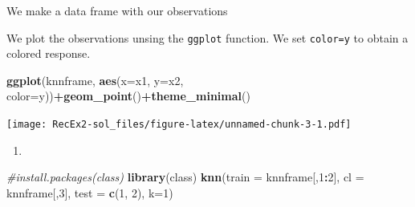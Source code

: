 \documentclass[]{article}
\newenvironment{Shaded}{\begin{snugshade}}{\end{snugshade}}
\newcommand{\KeywordTok}[1]{\textcolor[rgb]{0.13,0.29,0.53}{\textbf{#1}}}
\newcommand{\DataTypeTok}[1]{\textcolor[rgb]{0.13,0.29,0.53}{#1}}
\newcommand{\DecValTok}[1]{\textcolor[rgb]{0.00,0.00,0.81}{#1}}
\newcommand{\StringTok}[1]{\textcolor[rgb]{0.31,0.60,0.02}{#1}}
\newcommand{\CommentTok}[1]{\textcolor[rgb]{0.56,0.35,0.01}{\textit{#1}}}
\newcommand{\OperatorTok}[1]{\textcolor[rgb]{0.81,0.36,0.00}{\textbf{#1}}}
\newcommand{\NormalTok}[1]{#1}
\begin{document}
We make a data frame with our observations

\begin{Shaded}
\end{Shaded}

We plot the observations unsing the \texttt{ggplot} function. We set
\texttt{color=y} to obtain a colored response.

\begin{Shaded}
\begin{Highlighting}[]
\KeywordTok{ggplot}\NormalTok{(knnframe, }\KeywordTok{aes}\NormalTok{(}\DataTypeTok{x=}\NormalTok{x1, }\DataTypeTok{y=}\NormalTok{x2, }\DataTypeTok{color=}\NormalTok{y))}\OperatorTok{+}\KeywordTok{geom_point}\NormalTok{()}\OperatorTok{+}\KeywordTok{theme_minimal}\NormalTok{()}
\end{Highlighting}
\end{Shaded}

\texttt{[image: RecEx2-sol\_files/figure-latex/unnamed-chunk-3-1.pdf]}

\begin{enumerate}
\def\labelenumi{\alph{enumi}.}
\setcounter{enumi}{5}
\item
\end{enumerate}

\begin{Shaded}
\begin{Highlighting}[]
\CommentTok{#install.packages(class)}
\KeywordTok{library}\NormalTok{(class)}
\KeywordTok{knn}\NormalTok{(}\DataTypeTok{train =}\NormalTok{ knnframe[,}\DecValTok{1}\OperatorTok{:}\DecValTok{2}\NormalTok{], }\DataTypeTok{cl =}\NormalTok{ knnframe[,}\DecValTok{3}\NormalTok{], }\DataTypeTok{test =} \KeywordTok{c}\NormalTok{(}\DecValTok{1}\NormalTok{, }\DecValTok{2}\NormalTok{), }\DataTypeTok{k=}\DecValTok{1}\NormalTok{)}
\end{Highlighting}
\end{Shaded}
\end{document}
